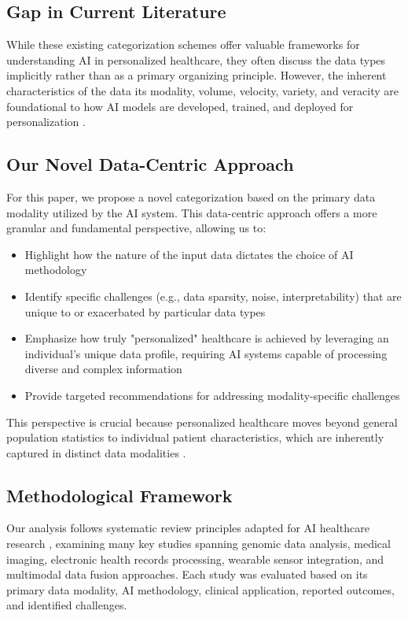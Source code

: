 \documentclass[runningheads]{llncs}
\begin{document}
\subsection{Gap in Current Literature}
While these existing categorization schemes offer valuable frameworks for understanding AI in personalized healthcare, they often discuss the data types implicitly rather than as a primary organizing principle. However, the inherent characteristics of the data its modality, volume, velocity, variety, and veracity are foundational to how AI models are developed, trained, and deployed for personalization \cite{ai_precision_medicine_2024}.

\subsection{Our Novel Data-Centric Approach}
For this paper, we propose a novel categorization based on the primary data modality utilized by the AI system. This data-centric approach offers a more granular and fundamental perspective, allowing us to:
\begin{itemize}
    \item Highlight how the nature of the input data dictates the choice of AI methodology
    \item Identify specific challenges (e.g., data sparsity, noise, interpretability) that are unique to or exacerbated by particular data types
    \item Emphasize how truly "personalized" healthcare is achieved by leveraging an individual's unique data profile, requiring AI systems capable of processing diverse and complex information
    \item Provide targeted recommendations for addressing modality-specific challenges
\end{itemize}

This perspective is crucial because personalized healthcare moves beyond general population statistics to individual patient characteristics, which are inherently captured in distinct data modalities \cite{precision_ai_future_2021}.

\subsection{Methodological Framework}
Our analysis follows systematic review principles adapted for AI healthcare research \cite{prisma_ai_guidelines_2023}, examining many key studies spanning genomic data analysis, medical imaging, electronic health records processing, wearable sensor integration, and multimodal data fusion approaches. Each study was evaluated based on its primary data modality, AI methodology, clinical application, reported outcomes, and identified challenges.
\end{document}
